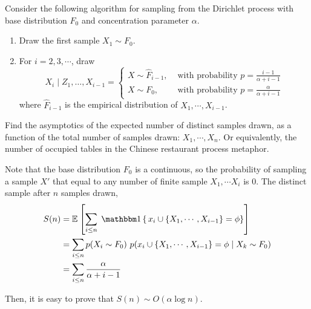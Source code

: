 \begin{exercise}
	Consider the following algorithm for sampling from the Dirichlet process with base distribution $F_0$ and concentration parameter $\alpha$. 
	\begin{enumerate}
		\item Draw the first sample $X_1 \sim F_0$.
		\item For $i = 2, 3, \cdots $, draw
\begin{equation}
X_{i} \mid Z_{1}, \ldots, X_{i-1}=\left\{\begin{array}{ll}
X \sim \hat{F}_{i-1}, & \text { with probability } p=\frac{i-1}{\alpha+i-1} \\
X \sim F_{0}, & \text { with probability } p=\frac{\alpha}{\alpha+i-1}
\end{array}\right.
\end{equation}
where $\widehat{F}_{i - 1}$ is the empirical distribution of $X_1, \cdots , X_{i - 1}$.
	\end{enumerate}
Find the asymptotics of the expected number of distinct samples drawn, as a function of the total number of
samples drawn: $X_1, \cdots , X_n$. Or equivalently, the number of occupied tables in the Chinese restaurant process
metaphor.
\end{exercise}
\begin{sol}
Note that the base distribution $F_0$ is a continuous, so the probability of sampling a sample $X'$ that equal to any number of finite sample $X_1, \cdots X_i$ is $0$. The distinct sample after $n$ samples drawn, 
\begin{align}
	S(n) & = \E{}{\sum_{i \leq n} \Ind{x_i\cup \{X_1, \cdots, X_{i-1} \} = \phi} } \\
	& = \sum_{i \leq n} p(X_i \sim F_0)\ p(x_i\cup \{X_1, \cdots, X_{i-1} \} = \phi  \mid X_k \sim F_0) \\
	& = \sum_{i \leq n} \frac{\alpha}{\alpha + i - 1}
\end{align}

Then, it is easy to prove that $S(n) \sim O(\alpha \log n)$.

\end{sol}

